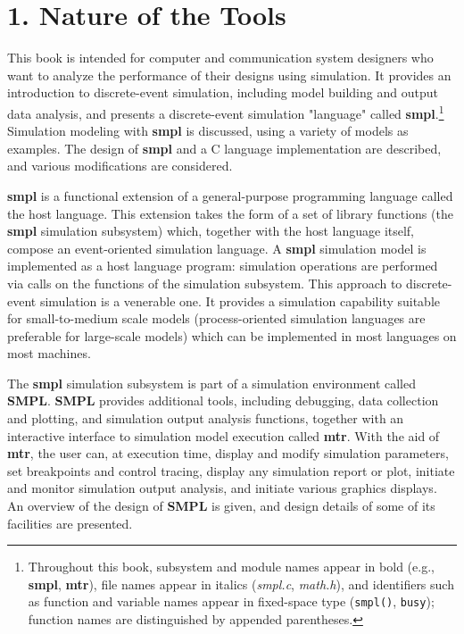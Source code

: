 \section*{1. Nature of the Tools}

This book is intended for computer and communication system designers who want
to analyze the performance of their designs using simulation. It provides an
introduction to discrete-event simulation, including model building and output
data analysis, and presents a discrete-event simulation "language" called
\textbf{smpl}.\footnote{Throughout this book, subsystem and module names appear
in bold (e.g., \textbf{smpl}, \textbf{mtr}), file names appear in italics
(\textit{smpl.c}, \textit{math.h}), and identifiers such as function and
variable names appear in fixed-space type (\texttt{smpl()}, \texttt{busy});
function names are distinguished by appended parentheses.} Simulation modeling
with \textbf{smpl} is discussed, using a variety of models as examples. The
design of \textbf{smpl} and a C language implementation are described, and
various modifications are considered.

\textbf{smpl} is a functional extension of a general-purpose programming language called
the host language. This extension takes the form of a set of library functions
(the \textbf{smpl} simulation subsystem) which, together with the host language itself,
compose an event-oriented simulation language. A \textbf{smpl} simulation model is
implemented as a host language program: simulation operations are performed via
calls on the functions of the simulation subsystem. This approach to
discrete-event simulation is a venerable one. It provides a simulation
capability suitable for small-to-medium scale models (process-oriented
simulation languages are preferable for large-scale models) which can be
implemented in most languages on most machines.

The \textbf{smpl} simulation subsystem is part of a simulation environment called
\textbf{SMPL}. \textbf{SMPL} provides additional tools, including debugging, data collection and
plotting, and simulation output analysis functions, together with an interactive
interface to simulation model execution called \textbf{mtr}. With the aid of \textbf{mtr}, the
user can, at execution time, display and modify simulation parameters, set
breakpoints and control tracing, display any simulation report or plot, initiate
and monitor simulation output analysis, and initiate various graphics displays.
An overview of the design of \textbf{SMPL} is given, and design details of some of its
facilities are presented.

